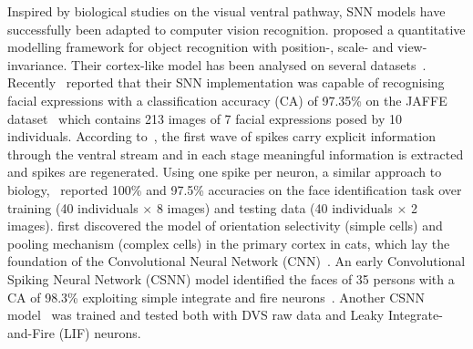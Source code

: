 \documentclass{frontiersENG} %
\begin{document}
Inspired by biological studies on the visual ventral pathway, SNN models have successfully been adapted to computer vision recognition. \cite{riesenhuber1999hierarchical} proposed a quantitative modelling framework for object recognition with position-, scale- and view-invariance.
Their cortex-like model has been analysed on several datasets~\citep{serre2007robust}.
Recently~\cite{fu2012spiking} reported that their SNN implementation was capable of recognising facial expressions with a classification accuracy (CA) of 97.35\% on the JAFFE dataset~\citep{lyons1998coding} which contains 213 images of 7 facial expressions posed by 10 individuals.
According to~\cite{vanrullen2002surfing}, the first wave of spikes carry explicit information through the ventral stream and in each stage meaningful information is extracted and spikes are regenerated. 
Using one spike per neuron, a similar approach to biology,~\cite{delorme2001face} reported 100\% and 97.5\% accuracies on the face identification task over
training (40 individuals $\times$ 8 images) and testing data (40 individuals $\times$ 2 images).
\cite{hubel1962receptive} first discovered the model of orientation selectivity (simple cells) and pooling mechanism (complex cells) in the primary cortex in cats, which lay the foundation of the Convolutional Neural Network (CNN)~\citep{lecun1998gradient}.
An early Convolutional Spiking Neural Network (CSNN) model identified the faces of 35 persons with a CA of 98.3\% exploiting simple integrate and fire neurons~\citep{matsugu2002convolutional}.
Another CSNN model~\citep{zhao2014feedforward} was trained and tested both with DVS raw data and Leaky Integrate-and-Fire (LIF) neurons.
\end{document}
